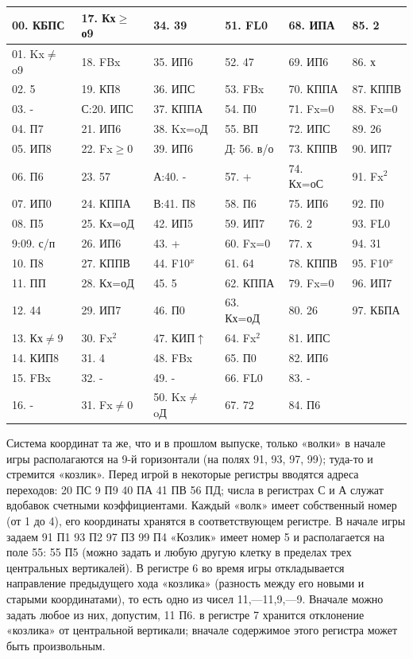 \documentclass[11pt,a4paper,oneside]{article}
\begin{document}
\begin{table}[]
\begin{tabular}{|l|l|l|l|l|l|}
\hline
00. КБПС  & 17. Кх$\geq$о9 & 34. 39    & 51. FL0    & 68. ИПА   & 85. 2    \\ \hline
01. Kx$\neq$o9 & 18. FBx   & 35. ИП6   & 52. 47     & 69. ИП6   & 86. х    \\ \hline
02. 5     & 19. КП8   & 36. ИПС   & 53. FBx    & 70. КППА  & 87. КППВ \\ \hline
03. -     & С:20. ИПС & 37. КППА  & 54. П0     & 71. Fx=0  & 88. Fx=0 \\ \hline
04. П7    & 21. ИП6   & 38. Kx=oД & 55. ВП     & 72. ИПС   & 89. 26   \\ \hline
05. ИП8   & 22. Fx$\geq$0  & 39. ИП6   & Д: 56. в/о & 73. КППВ  & 90. ИП7  \\ \hline
06. П6    & 23. 57    & А:40. -   & 57. +      & 74. Кх=оС & 91. Fx$^{2}$  \\ \hline
07. ИП0   & 24. КППА  & В:41. П8  & 58. П6     & 75. ИП6   & 92. П0   \\ \hline
08. П5    & 25. Кх=оД & 42. ИП5   & 59. ИП7    & 76. 2     & 93. FL0  \\ \hline
9:09. с/п & 26. ИП6   & 43. +     & 60. Fx=0   & 77. х     & 94. 31   \\ \hline
10. П8    & 27. КППВ  & 44. F10$^{x}$  & 61. 64     & 78. КППВ  & 95. F10$^{x}$ \\ \hline
11. ПП    & 28. Кх=оД & 45. 5     & 62. КППА   & 79. Fx=0  & 96. ИП7  \\ \hline
12. 44    & 29. ИП7   & 46. П0    & 63. Кх=оД  & 80. 26    & 97. КБПА \\ \hline
13. Кх$\neq$9  & 30. Fx$^{2}$   & 47. КИП$\uparrow$  & 64. Fx$^{2}$    & 81. ИПС   &          \\ \hline
14. КИП8  & 31. 4     & 48. FBx   & 65. П0     & 82. ИП6   &          \\ \hline
15. FBx   & 32. -     & 49. -     & 66. FL0    & 83. -     &          \\ \hline
16. -     & 31. Fx$\neq$0  & 50. Kx$\neq$oД & 67. 72     & 84. П6    &          \\ \hline
\end{tabular}
\end{table}

Система координат та же, что и в прошлом выпуске, только «волки» в начале игры располагаются на 9-й горизонтали (на полях 91, 93, 97, 99); туда-то и стремится «козлик». Перед игрой в некоторые регистры вводятся адреса переходов: 20 ПС 9 П9 40 ПА 41 ПВ 56 ПД; числа в регистрах С и А служат вдобавок счетными коэффициентами. Каждый «волк» имеет собственный номер (от 1 до 4), его координаты хранятся в соответствующем регистре. В начале игры задаем 91 П1 93 П2 97 ПЗ 99 П4 «Козлик» имеет номер 5 и располагается на поле 55: 55 П5 (можно задать и любую другую клетку в пределах трех центральных вертикалей). В регистре 6 во время игры откладывается направление предыдущего хода «козлика» (разность между его новыми и старыми координатами), то есть одно из чисел 11,—11,9,—9. Вначале можно задать любое из них, допустим, 11 П6. в регистре 7 хранится отклонение «козлика» от центральной вертикали; вначале содержимое этого регистра может быть произвольным.
\end{document}
